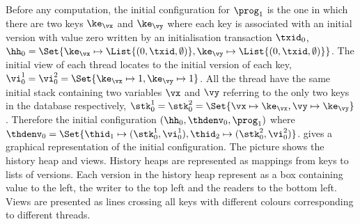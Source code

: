 Before any computation, the initial configuration for $\prog_1$ is the one in which there are two keys \( \ke_{\vx}\) and \( \ke_{\vy} \) where each key is associated with an initial version with value zero written by an initialisation transaction $\txid_0$, \( \hh_{0} = \Set{\ke_{\vx} \mapsto \List{(0, \txid, \emptyset)}, \ke_{\vy} \mapsto \List{(0, \txid, \emptyset)}} \).
The initial view of each thread locates to the initial version of each key, \( \vi^{1}_{0} = \vi^{2}_{0} = \Set{\ke_{\vx} \mapsto 1, \ke_{\vy} \mapsto 1}\).
All the thread have the same initial stack containing two variables \( \vx \) and \( \vy \) referring to the only two keys in the database respectively, \ie \( \stk^{1}_{0} = \stk^{2}_{0} = \Set{\vx \mapsto \ke_{\vx}, \vy \mapsto \ke_{\vy}}\).
Therefore the initial configuration \( (\hh_{0}, \thdenv_{0}, \prog_{1}) \) where \( \thdenv_{0} = \Set{\thid_{1} \mapsto (\stk_{0}^{1}, \vi_{0}^{1}), \thid_{2} \mapsto (\stk_{0}^{2}, \vi_{0}^{2})}\).
 gives a graphical representation of the initial configuration.
The picture shows the history heap and views.
History heaps are represented as mappings from keys to lists of versions.
Each version in the history heap represent as a box containing value to the left, the writer to the top left and the readers to the bottom left.
Views are presented as lines crossing all keys with different colours corresponding to different threads.
 
